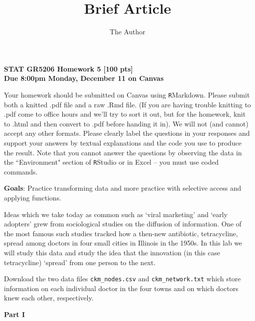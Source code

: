 \documentclass[12pt, leqno]{article}
\title{Brief Article}
\author{The Author}
\begin{document}
\begin{center}
{\large {\bf    STAT GR5206 Homework 5 [100 pts] \\ Due 8:00pm Monday, December 11 on Canvas}}
\end{center}


Your homework should be submitted on Canvas using \texttt{R}Markdown.  Please submit both a knitted .pdf file and a raw .Rmd file.  (If you are having trouble knitting to .pdf come to office hours and we'll try to sort it out, but for the homework, knit to .html and then convert to .pdf before handing it in). We will not (and cannot) accept any other formats.  Please clearly label the questions in your responses and support your answers by textual explanations and the code you use to produce the result.  Note that you cannot answer the questions by observing the data in the ``Environment" section of \texttt{R}Studio or in Excel -- you must use coded commands.

\textbf{Goals}: Practice transforming data and more practice with selective access and applying functions.

Ideas which we take today as common such as `viral marketing' and `early adopters' grew from sociological studies on the diffusion of information.  One of the most famous such studies tracked how a then-new antibiotic, tetracycline, spread among doctors in four small cities in Illinois in the 1950s.  In this lab we will study this data and study the idea that the innovation (in this case tetracycline) `spread' from one person to the next.

Download the two data files \texttt{ckm\_nodes.csv} and \texttt{ckm\_network.txt} which store information on each individual doctor in the four towns and on which doctors knew each other, respectively.

\textbf{Part I}
\end{document}
